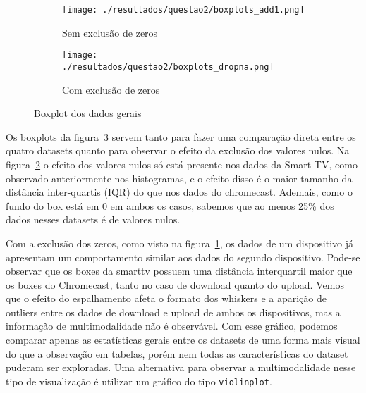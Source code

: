 \documentclass{article}
\begin{document}
\begin{figure}[h]
	\centering
	\begin{subfigure}{0.47\textwidth}
		\centering
		\caption{Sem exclusão de zeros}
		\texttt{[image: ./resultados/questao2/boxplots\_add1.png]}
		\label{fig:questao2-boxplots-sem-exclusao}
	\end{subfigure}
	\hfill
	\begin{subfigure}{0.47\textwidth}
		\centering
		\caption{Com exclusão de zeros}
		\texttt{[image: ./resultados/questao2/boxplots\_dropna.png]}
		\label{fig:questao2-boxplots-com-exclusao}
	\end{subfigure}
	\caption{Boxplot dos dados gerais}
	\label{fig:questao2-boxplots}
\end{figure}

Os boxplots da figura~\ref{fig:questao2-boxplots} servem tanto para fazer uma comparação direta entre os quatro datasets quanto para observar o efeito da exclusão dos valores nulos. Na figura~\ref{fig:questao2-boxplots-com-exclusao} o efeito dos valores nulos só está presente nos dados da Smart TV, como observado anteriormente nos histogramas, e o efeito disso é o maior tamanho da distância inter-quartis (IQR) do que nos dados do chromecast. Ademais, como o fundo do box está em 0 em ambos os casos, sabemos que ao menos 25\% dos dados nesses datasets é de valores nulos.

Com a exclusão dos zeros, como visto na figura~\ref{fig:questao2-boxplots-sem-exclusao}, os dados de um dispositivo já apresentam um comportamento similar aos dados do segundo dispositivo. Pode-se observar que os boxes da smarttv possuem uma distância interquartil maior que os boxes do Chromecast, tanto no caso de download quanto do upload. Vemos que o efeito do espalhamento afeta o formato dos whiskers e a aparição de outliers entre os dados de download e upload de ambos os dispositivos, mas a informação de multimodalidade não é observável. Com esse gráfico, podemos comparar apenas as estatísticas gerais entre os datasets de uma forma mais visual do que a observação em tabelas, porém nem todas as características do dataset puderam ser exploradas. Uma alternativa para observar a multimodalidade nesse tipo de visualização é utilizar um gráfico do tipo \texttt{violinplot}.
\end{document}
